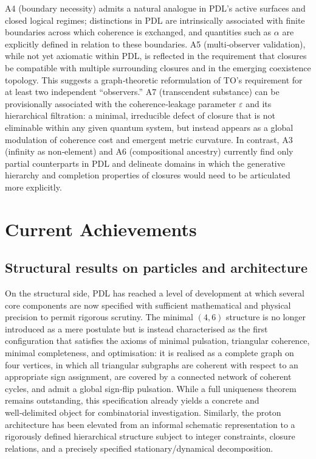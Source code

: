 \documentclass[11pt,a4paper]{article}
\begin{document}
A4 (boundary necessity) admits a natural analogue in PDL’s active surfaces and closed logical regimes; distinctions in PDL are intrinsically associated with finite boundaries across which coherence is exchanged, and quantities such as $\alpha$ are explicitly defined in relation to these boundaries.\cite{Laubscher2026Alpha,Laubscher2026FullPDL} A5 (multi‑observer validation), while not yet axiomatic within PDL, is reflected in the requirement that closures be compatible with multiple surrounding closures and in the emerging coexistence topology. This suggests a graph‑theoretic reformulation of TO’s requirement for at least two independent “observers.”\cite{Laubscher2026TopologicalReformulation,Laubscher2026DialogueTO} A7 (transcendent substance) can be provisionally associated with the coherence‑leakage parameter $\varepsilon$ and its hierarchical filtration: a minimal, irreducible defect of closure that is not eliminable within any given quantum system, but instead appears as a global modulation of coherence cost and emergent metric curvature.\cite{Laubscher2026FullPDL,Laubscher2026Exponent18,Laubscher2026TopologicalReformulation} In contrast, A3 (infinity as non‑element) and A6 (compositional ancestry) currently find only partial counterparts in PDL and delineate domains in which the generative hierarchy and completion properties of closures would need to be articulated more explicitly.\cite{Laubscher2026DialogueTO}

\section{Current Achievements}

\subsection{Structural results on particles and architecture}
On the structural side, PDL has reached a level of development at which several core components are now specified with sufficient mathematical and physical precision to permit rigorous scrutiny.\cite{Laubscher2026FullPDL,Laubscher2026IntroPDL} The minimal $(4,6)$ structure is no longer introduced as a mere postulate but is instead characterised as the first configuration that satisfies the axioms of minimal pulsation, triangular coherence, minimal completeness, and optimisation: it is realised as a complete graph on four vertices, in which all triangular subgraphs are coherent with respect to an appropriate sign assignment, are covered by a connected network of coherent cycles, and admit a global sign‑flip pulsation.\cite{Laubscher2026IntroPDL} While a full uniqueness theorem remains outstanding, this specification already yields a concrete and well‑delimited object for combinatorial investigation. Similarly, the proton architecture has been elevated from an informal schematic representation to a rigorously defined hierarchical structure subject to integer constraints, closure relations, and a precisely specified stationary/dynamical decomposition.\cite{Laubscher2026FullPDL,Laubscher2026CombinatorialProton}
\end{document}
